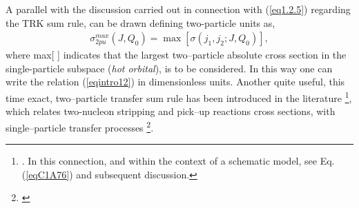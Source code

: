 




A parallel with the discussion carried out in connection with (\ref{eq1.2.5}) regarding the TRK sum rule, can be drawn defining two-particle units as,
\begin{align}
\sigma^{max}_{2pu}(J,Q_0)=\max \left[\sigma(j_1,j_2;J,Q_0)\right],
\end{align}
where max[ ] indicates that the largest two--particle absolute cross section in the single-particle subspace (\textit{hot orbital}), is to be considered. In this way one can write the relation (\ref{eqintro12}) in dimensionless units.  Another quite useful, this time exact, two--particle transfer sum rule has been introduced in the literature \footnote{\cite{Bayman:72}. In this connection, and within the context of a schematic model, see Eq. (\ref{eqC1A76}) and subsequent discussion.}, which relates two-nucleon stripping and pick--up reactions cross sections, with single--particle transfer processes \footnote{\cite{Lanford:77}}.


